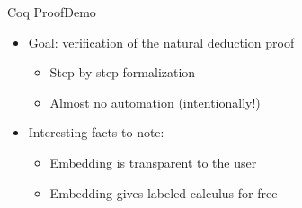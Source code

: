 
\begin{frame}{Coq Proof}{Demo} \small
\begin{itemize}
\item Goal: verification of the natural deduction proof
\begin{itemize}
\item Step-by-step formalization
\pause
\item Almost no automation (intentionally!)
\end{itemize}
%
\pause
\item Interesting facts to note:
\begin{itemize}
\item Embedding is transparent to the user
\pause
\item Embedding gives labeled calculus for free
\end{itemize}
\end{itemize}
\end{frame}
